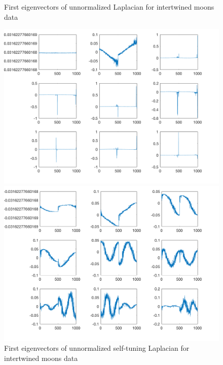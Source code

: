 \documentclass{siamart1116}
\begin{document}
\begin{figure}[!htb]
    \begin{minipage}{0.48\textwidth}
        \centering
        \caption{\label{fig:moon_laplacian_un} First eigenvectors of unnormalized Laplacian for intertwined moons data}
        \includegraphics[width=\linewidth]{graphics/moon_laplacian_un.png}
    \end{minipage} \hfill
    \begin{minipage}{0.48\textwidth}
        \centering
        \caption{\label{fig:moon_laplacian_selftuning} First eigenvectors of unnormalized self-tuning Laplacian for intertwined moons data}
        \includegraphics[width=\linewidth]{graphics/moon_laplacian_selftuning.png}
    \end{minipage}
\end{figure}
\end{document}
